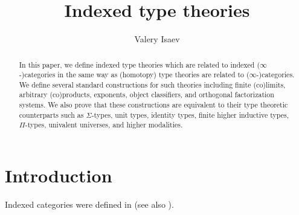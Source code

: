 \documentclass[reqno]{amsart}
\theoremstyle{definition}
\theoremstyle{remark}
\numberwithin{figure}{section}
\begin{document}
\title{Indexed type theories}

\author{Valery Isaev}

\begin{abstract}
In this paper, we define indexed type theories which are related to indexed ($\infty$-)categories in the same way as (homotopy) type theories are related to ($\infty$-)categories.
We define several standard constructions for such theories including finite (co)limits, arbitrary (co)products, exponents, object classifiers, and orthogonal factorization systems.
We also prove that these constructions are equivalent to their type theoretic counterparts such as $\Sigma$-types, unit types, identity types, finite higher inductive types, $\Pi$-types, univalent universes, and higher modalities.
\end{abstract}

\maketitle

\section{Introduction}

Indexed categories were defined in \cite{indexed-cats} (see also \cite[B1]{elephant}).


\end{document}
